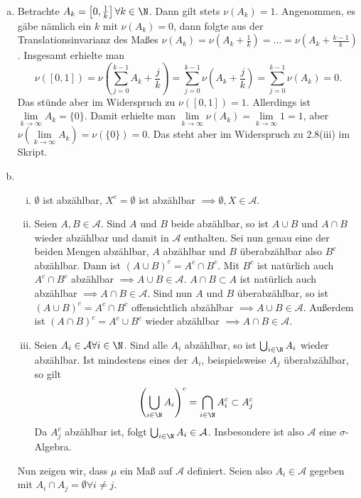 \documentclass{article}
\begin{document}
    \begin{enumerate}[(a)]
        \item Betrachte $A_k = \left[0, \frac{1}{k}\right] \forall k\in \N$. Dann gilt stets $\nu(A_k) = 1$. Angenommen, es gäbe nämlich ein $k$ mit $\nu(A_k) = 0$, dann folgte aus der Translationsinvarianz des Maßes $\nu(A_k) = \nu(A_k + \frac{1}{k}) = \dots = \nu(A_k + \frac{k-1}{k})$. Insgesamt erhielte man 
        \[
            \nu([0,1]) = \nu\left(\sum_{j = 0}^{k-1} A_k + \frac{j}{k}\right) = \sum_{j = 0}^{k-1} \nu(A_k + \frac{j}{k}) = \sum_{j = 0}^{k-1} \nu(A_k) = 0.
        \]
        Das stünde aber im Widerspruch zu $\nu([0,1]) = 1$. Allerdings ist $\lim\limits_{k \to \infty} A_k = \{0\}$. Damit erhielte man $\lim\limits_{k \to \infty} \nu(A_k) = \lim\limits_{k \to \infty} 1 = 1$, aber $\nu\left(\lim\limits_{k \to \infty} A_k\right) = \nu(\{0\}) = 0$. Das steht aber im Widerspruch zu 2.8(iii) im Skript.
        \item \begin{enumerate}[(i)]
            \item $\emptyset$ ist abzählbar, $X^c = \emptyset$ ist abzählbar $\implies \emptyset, X\in \mathcal{A}$.
            \item Seien $A, B \in \mathcal{A}$. Sind $A$ und $B$ beide abzählbar, so ist $A\cup B$ und $A\cap B$ wieder abzählbar und damit in $\mathcal{A}$ enthalten. Sei nun genau eine der beiden Mengen abzählbar, \obda $A$ abzählbar und $B$ überabzählbar also $B^c$ abzählbar. Dann ist $(A\cup B)^c = A^c \cap B^c$. Mit $B^c$ ist natürlich auch $A^c \cap B^c$ abzählbar $\implies A\cup B \in \mathcal{A}$. $A \cap B \subset A$ ist natürlich auch abzählbar $\implies A\cap B \in \mathcal{A}$. Sind nun $A$ und $B$ überabzählbar, so ist $(A\cup B)^c = A^c \cap B^c$ offensichtlich abzählbar $\implies A \cup B \in \mathcal{A}$. Außerdem ist $(A\cap B)^c = A^c \cup B^c$ wieder abzählbar $\implies A \cap B \in \mathcal{A}$.
            \item Seien $A_i \in \mathcal{A} \forall i\in \N$. Sind alle $A_i$ abzählbar, so ist $\bigcup_{i\in \N} A_i$ wieder abzählbar. Ist mindestens eines der $A_i$, beispielsweise $A_j$ überabzählbar, so gilt 
            \[
                \left(\bigcup_{i\in \N} A_i\right)^c = \bigcap_{i\in \N} A_i^c \subset A_j^c
            \]
            Da $A_j^c$ abzählbar ist, folgt $\bigcup_{i\in \N} A_i \in \mathcal{A}$. Insbesondere ist also $\mathcal{A}$ eine $\sigma$-Algebra.
        \end{enumerate}
        Nun zeigen wir, dass $\mu$ ein Maß auf $\mathcal{A}$ definiert. Seien also $A_i\in \mathcal{A}$ gegeben mit $A_i \cap A_j = \emptyset \forall i \neq j$.

\end{enumerate}
\end{document}
